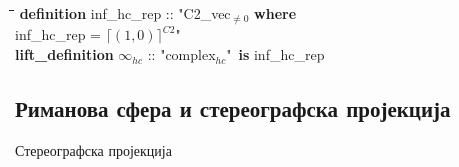 \documentclass[slidestop, compress, mathserif, containsverbatim, xcolor=dvipsnames]{beamer}
\newcommand{\Absnzv}[1]{\ensuremath{\lceil#1\rceil^{C2}}}
\begin{document}
\begin{frame}{}
\begin{itemize}
\begin{footnotesize}
{    \begin{tabbing}
      \hspace{5mm}\=\hspace{5mm}\=\hspace{5mm}\=\hspace{5mm}\=\hspace{5mm}\=\kill
      {\bf definition} inf\_hc\_rep :: "{}C2\_vec$_{\neq 0}$ {\bf where} \\
      \> inf\_hc\_rep = \Absnzv{(1, 0)}"\\
      {\bf lift\_definition} $\infty_{hc}$ :: "{}complex$_{hc}$"\ {\bf is} inf\_hc\_rep
    \end{tabbing}
  } \end{footnotesize}
  \end{itemize}
\end{frame}


\subsection*{Риманова сфера и стереографска пројекција}

\begin{frame}{Стереографска пројекција}
  \begin{center}
    
  \end{center}
\end{frame}
\end{document}

